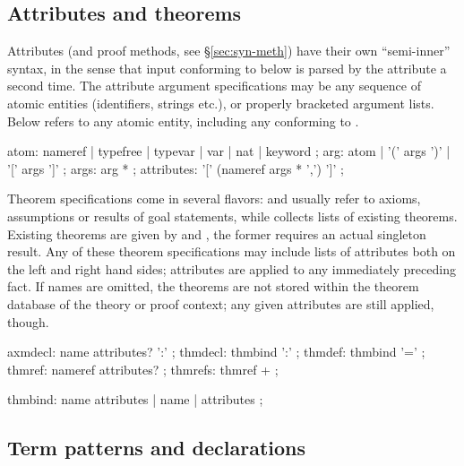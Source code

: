 \subsection{Attributes and theorems}\label{sec:syn-att}

Attributes (and proof methods, see \S\ref{sec:syn-meth}) have their own
``semi-inner'' syntax, in the sense that input conforming to
 below is parsed by the attribute a second time.  The
attribute argument specifications may be any sequence of atomic entities
(identifiers, strings etc.), or properly bracketed argument lists.  Below
 refers to any atomic entity, including any 
conforming to .

\begin{rail}
  atom: nameref | typefree | typevar | var | nat | keyword
  ;
  arg: atom | '(' args ')' | '[' args ']'
  ;
  args: arg *
  ;
  attributes: '[' (nameref args * ',') ']'
  ;
\end{rail}

Theorem specifications come in several flavors:  and
 usually refer to axioms, assumptions or results of goal
statements, while  collects lists of existing theorems.
Existing theorems are given by  and ,
the former requires an actual singleton result.  Any of these theorem
specifications may include lists of attributes both on the left and right hand
sides; attributes are applied to any immediately preceding fact.  If names are
omitted, the theorems are not stored within the theorem database of the theory
or proof context; any given attributes are still applied, though.

\begin{rail}
  axmdecl: name attributes? ':'
  ;
  thmdecl: thmbind ':'
  ;
  thmdef: thmbind '='
  ;
  thmref: nameref attributes?
  ;
  thmrefs: thmref +
  ;

  thmbind: name attributes | name | attributes
  ;
\end{rail}


\subsection{Term patterns and declarations}\label{sec:term-decls}

